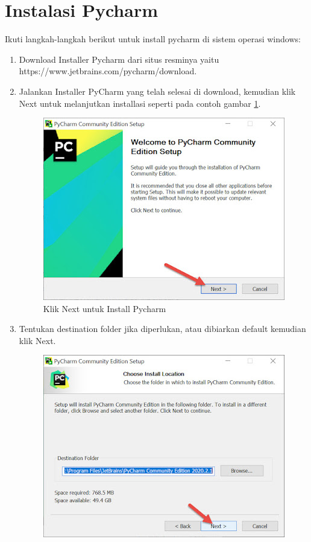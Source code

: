 \section{Instalasi Pycharm}
Ikuti langkah-langkah berikut untuk install pycharm di sistem operasi windows:
\begin{enumerate}
\item Download Installer Pycharm dari situs resminya yaitu  https://www.jetbrains.com/pycharm/download.
\item Jalankan Installer PyCharm yang telah selesai di download, kemudian klik Next untuk melanjutkan installasi seperti pada contoh gambar \ref{installpycharm}.
\begin{figure}[H]
\centering
\includegraphics[scale=.65]{figures/install_pycharm1}
\caption{Klik Next untuk Install Pycharm}
\label{installpycharm}
\end{figure}
\item Tentukan destination folder jika diperlukan, atau dibiarkan default kemudian klik Next.
\begin{figure}[H]
\centering
\includegraphics[scale=.65]{figures/install_pycharm2}

\end{figure}
\end{enumerate}
